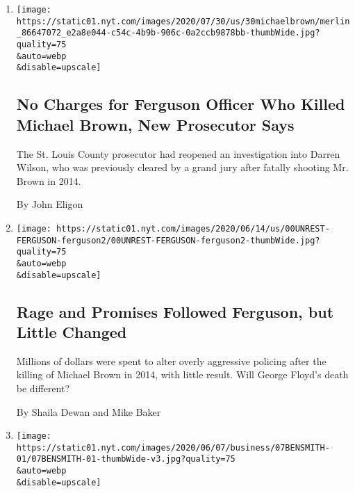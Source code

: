 \begin{enumerate}
\def\labelenumi{\arabic{enumi}.}
\item
  \href{/2020/07/30/us/michael-brown-darren-wilson-ferguson.html}{}

  \texttt{[image: https://static01.nyt.com/images/2020/07/30/us/30michaelbrown/merlin\_86647072\_e2a8e044-c54c-4b9b-906c-0a2ccb9878bb-thumbWide.jpg?quality=75\\\&auto=webp\\\&disable=upscale]}

  \hypertarget{no-charges-for-ferguson-officer-who-killed-michael-brown-new-prosecutor-says}{%
  \subsection{No Charges for Ferguson Officer Who Killed Michael Brown,
  New Prosecutor
  Says}\label{no-charges-for-ferguson-officer-who-killed-michael-brown-new-prosecutor-says}}

  The St. Louis County prosecutor had reopened an investigation into
  Darren Wilson, who was previously cleared by a grand jury after
  fatally shooting Mr. Brown in 2014.

  By John Eligon
\item
  \href{/2020/06/13/us/unrest-ferguson-police-reform.html}{}

  \texttt{[image: https://static01.nyt.com/images/2020/06/14/us/00UNREST-FERGUSON-ferguson2/00UNREST-FERGUSON-ferguson2-thumbWide.jpg?quality=75\\\&auto=webp\\\&disable=upscale]}

  \hypertarget{rage-and-promises-followed-ferguson-but-little-changed}{%
  \subsection{Rage and Promises Followed Ferguson, but Little
  Changed}\label{rage-and-promises-followed-ferguson-but-little-changed}}

  Millions of dollars were spent to alter overly aggressive policing
  after the killing of Michael Brown in 2014, with little result. Will
  George Floyd's death be different?

  By Shaila Dewan and Mike Baker
\item
  \href{/2020/06/07/business/media/new-york-times-washington-post-protests.html}{}

  \texttt{[image: https://static01.nyt.com/images/2020/06/07/business/07BENSMITH-01/07BENSMITH-01-thumbWide-v3.jpg?quality=75\\\&auto=webp\\\&disable=upscale]}

  \hypertarget{the-media-equation}{%
}
\end{enumerate}
